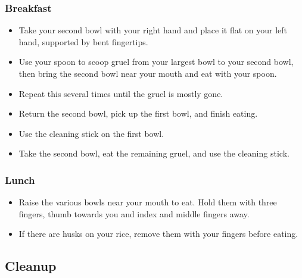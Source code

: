 \documentclass{article}
\begin{document}
\begin{multicols}{2}
\subsubsection{Breakfast}
\begin{itemize}
\item Take your second bowl with your right hand and place it flat on
  your left hand, supported by bent fingertips.
\item Use your spoon to scoop gruel from your largest bowl to your
  second bowl, then bring the second bowl near your mouth and eat
  with your spoon.
\item Repeat this several times until the gruel is mostly gone.
\item Return the second bowl, pick up the first bowl, and finish eating.
\item Use the cleaning stick on the first bowl.
\item Take the second bowl, eat the remaining gruel, and use the cleaning
  stick.
\end{itemize}

\subsubsection{Lunch}
\begin{itemize}
\item Raise the various bowls near your mouth to eat. Hold them with three
  fingers, thumb towards you and index and middle fingers away.
\item If there are husks on your rice, remove them with your fingers before
  eating.
\end{itemize}

\subsection{Cleanup}


\end{multicols}
\end{document}
